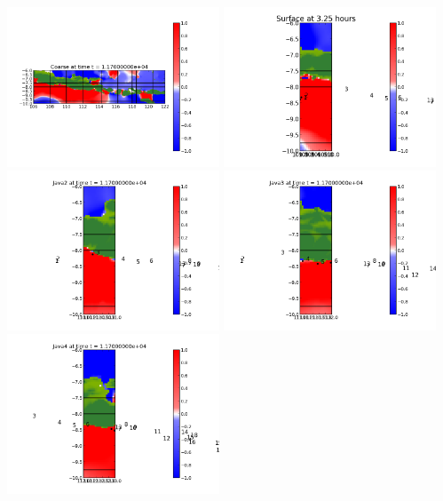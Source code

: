 \documentclass[11pt]{article}
\begin{document}
\vskip 10pt 
\includegraphics[width=0.475\textwidth]{frame0013fig0.png}
\includegraphics[width=0.475\textwidth]{frame0013fig15.png}
\vskip 10pt 
\includegraphics[width=0.475\textwidth]{frame0013fig25.png}
\includegraphics[width=0.475\textwidth]{frame0013fig20.png}
\vskip 10pt 
\includegraphics[width=0.475\textwidth]{frame0013fig30.png}
\end{document}
